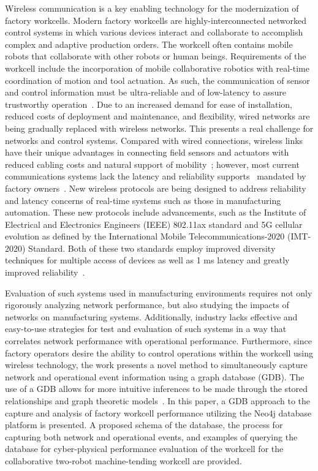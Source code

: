 Wireless communication is a key enabling technology for the modernization of factory workcells. Modern factory workcells are highly-interconnected networked control systems in which various devices interact and collaborate to accomplish complex and adaptive production orders. The workcell often contains mobile robots that collaborate with other robots or human beings. Requirements of the workcell include the incorporation of mobile collaborative robotics with real-time coordination of motion and tool actuation.  As such, the communication of sensor and control information must be ultra-reliable and of low-latency to assure trustworthy operation~\cite{wirelessAutomation2017}. Due to an increased demand for ease of installation, reduced costs of deployment and maintenance, and flexibility, wired networks are being gradually replaced with wireless networks. This presents a real challenge for networks and control systems. Compared with wired connections, wireless links have their unique advantages in connecting field sensors and actuators with reduced cabling costs and natural support of mobility~\cite{ieMag2018}; however, most current communications systems lack the latency and reliability supports~\cite{etsi103588} mandated by factory owners~\cite{Industry40, SmartManuf}.  New wireless protocols are being designed to address reliability and latency concerns of real-time systems such as those in manufacturing automation.  These new protocols include advancements, such as the Institute of Electrical and Electronics Engineers (IEEE) 802.11ax standard and 5G cellular evolution as defined by the International Mobile Telecommunications-2020 (IMT-2020) Standard.  Both of these two standards employ improved diversity techniques for multiple access of devices as well as 1 ms latency and greatly improved reliability~\cite{80211ax}. 

Evaluation of such systems used in manufacturing environments requires not only rigorously analyzing  network performance, but also studying the impacts of networks on manufacturing systems. Additionally, industry lacks effective and easy-to-use strategies for test and evaluation of such systems in a way that correlates network performance with operational performance. Furthermore, since factory operators desire the ability to control operations within the workcell using wireless technology, the work presents a novel method to simultaneously capture network and operational event information using a graph database (GDB).  The use of a GDB allows for more intuitive inferences to be made through the stored relationships and graph theoretic models~\cite{Angles:2008:SGD:1322432.1322433}. In this paper, a GDB approach to the capture and analysis of factory workcell performance utilizing the Neo4j database platform is presented. A proposed schema of the database, the process for capturing both network and operational events, and examples of querying the database for cyber-physical performance evaluation of the workcell for the collaborative two-robot machine-tending workcell\cite{Liu2019vancouver} are provided.

